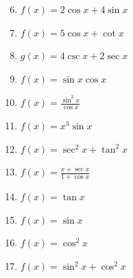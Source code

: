 \documentclass[12pt]{article}
\newif\ifans
\begin{document}
\begin{enumerate}
\setcounter{enumi}{5}

\item $f(x) = 2\cos{x}+4\sin{x}$ 

\ifans{\fbox{$-2\sin{x}+4\cos{x}$}} \fi

\item $f(x) = 5\cos{x}+\cot{x}$ 

\ifans{\fbox{$-5\sin{x}-\csc^2{x}$}} \fi

\item $g(x) = 4\csc {x} + 2\sec{x}$ 

\ifans{\fbox{$-4\csc{(x)}\cot{(x)}+2\sec{(x)}\tan{(x)}$}} \fi

\item $f(x) = \sin{x}\cos{x}$ 

\ifans{\fbox{$\cos^2{x}-\sin^2{x}$}} \fi

\item $f(x) = \frac{\sin^2{x}}{\cos{x}}$ 

\ifans{\fbox{$2\sin{x}+\sin{x}\tan^{2}{x} $}} \fi

\item $f(x) = x^3\sin{x}$ 

\ifans{\fbox{$3x^2\sin{x}+x^3\cos{x}$}} \fi

\item $f(x) = \sec^2{x}+\tan^2{x}$ 

\ifans{\fbox{$4\sec^2{(x)}\tan{(x)}$}} \fi

\item $f(x) = \frac{x+\sec{x}}{1+\cos{x}}$ 

\ifans{\fbox{$\frac{1+2\tan{x}+\cos{x}+\sec{(x)}\tan{(x)}+x\sin{x}}{(1+\cos{x})^2}$ }} \fi

\end{enumerate}


\begin{enumerate}
\setcounter{enumi}{13}

\item $f(x) = \tan{x}$ 

\ifans{\fbox{$2\sec^2{x}\tan{x}$}} \fi

\item $f(x) = \sin{x}$ 

\ifans{\fbox{$-\sin{x}$}} \fi

\item $f(x) = \cos^2{x}$ 

\ifans{\fbox{$2\sin^2{x}-2\cos^2{x}$}} \fi

\item $f(x) = \sin^2{x}+\cos^2{x}$ 

\ifans{\fbox{0}} \fi

\end{enumerate}
\end{document}
